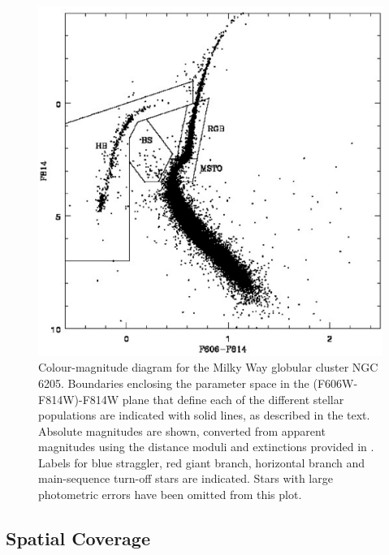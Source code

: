 \begin{figure} [!h]
  \begin{center}
 \includegraphics[scale=0.5]{Chapter-4/fig1.eps}
\caption[Plot showing the parameter space in the (F606W-F814W)-F814W
plane defining each of the different stellar populations for the GC
NGC 6205]{Colour-magnitude diagram for the Milky Way globular cluster
  NGC 6205.  Boundaries enclosing the parameter space in the 
  (F606W-F814W)-F814W plane that define each of the different stellar
  populations are indicated with solid lines, as described in the
  text.  Absolute 
  magnitudes are shown, converted from apparent magnitudes using the
  distance moduli and extinctions provided in \citet{dotter10}.
  Labels for blue straggler, red giant branch, horizontal branch and
  main-sequence turn-off stars are indicated.  Stars with large
  photometric errors have been omitted from this plot.
\label{fig:fig1}}
\end{center}
\end{figure}

\subsection{Spatial Coverage} \label{spatial4}

